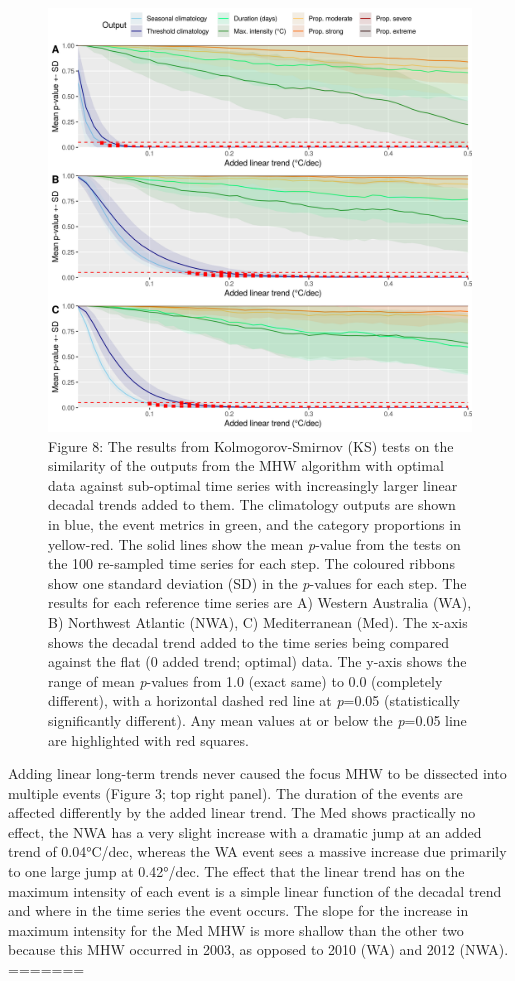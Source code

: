 \documentclass[]{article}
\begin{document}
{\begin{figure}
\centering
\includegraphics{../LaTeX/fig_8.png}
\caption{Figure 8: The results from Kolmogorov-Smirnov (KS) tests on the
similarity of the outputs from the MHW algorithm with optimal data
against sub-optimal time series with increasingly larger linear decadal
trends added to them. The climatology outputs are shown in blue, the
event metrics in green, and the category proportions in yellow-red. The
solid lines show the mean \emph{p}-value from the tests on the 100
re-sampled time series for each step. The coloured ribbons show one
standard deviation (SD) in the \emph{p}-values for each step. The
results for each reference time series are A) Western Australia (WA), B)
Northwest Atlantic (NWA), C) Mediterranean (Med). The x-axis shows the
decadal trend added to the time series being compared against the flat
(0 added trend; optimal) data. The y-axis shows the range of mean
\emph{p}-values from 1.0 (exact same) to 0.0 (completely different),
with a horizontal dashed red line at \emph{p}=0.05 (statistically
significantly different). Any mean values at or below the \emph{p}=0.05
line are highlighted with red squares.}
\end{figure}

Adding linear long-term trends never caused the focus MHW to be
dissected into multiple events (Figure 3; top right panel). The duration
of the events are affected differently by the added linear trend. The
Med shows practically no effect, the NWA has a very slight increase with
a dramatic jump at an added trend of 0.04°C/dec, whereas the WA event
sees a massive increase due primarily to one large jump at 0.42°/dec.
The effect that the linear trend has on the maximum intensity of each
event is a simple linear function of the decadal trend and where in the
time series the event occurs. The slope for the increase in maximum
intensity for the Med MHW is more shallow than the other two because
this MHW occurred in 2003, as opposed to 2010 (WA) and 2012 (NWA).
=======

}
\end{document}
